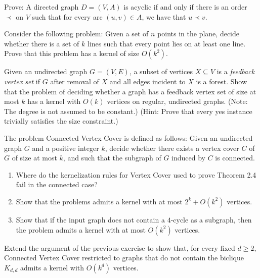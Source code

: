 \begin{exercise}[\easy]
  Prove: A directed graph $D = (V, A)$ is acyclic if and only if there is an order $\prec$ on $V$ such that for every arc $(u, v) \in A$, we have that $u \prec v$.
\end{exercise}

\begin{exercise}[\easy]
  Consider the following problem: Given a set of $n$ points in the plane, decide whether
  there is a set of $k$ lines such that every point lies on at least one line. Prove that this problem has a
  kernel of size $O(k^2)$.
\end{exercise}

\begin{exercise}
  Given an undirected graph $G = (V, E)$, a subset of vertices $X \subseteq V$ is a \emph{feedback vertex
  set} if $G$ after removal of $X$ and all edges incident to $X$ is a forest. Show that the problem of deciding
  whether a graph has a feedback vertex set of size at most $k$ has a kernel with $O(k)$ vertices on regular,
  undirected graphs. (Note: The degree is not assumed to be constant.)
  (Hint: Prove that every yes instance trivially satisfies the size constraint.)
\end{exercise}

\begin{exercise}
  The problem Connected Vertex Cover is defined as follows: Given an undirected graph
  $G$ and a positive integer $k$, decide whether there exists a vertex cover $C$ of $G$ of size at most $k$, and
  such that the subgraph of $G$ induced by $C$ is connected.
  \begin{enumerate}
      \item Where do the kernelization rules for Vertex Cover used to prove Theorem 2.4 fail in the connected
      case?
      \item Show that the problems admits a kernel with at most $2^k + O(k^2)$ vertices.
      \item Show that if the input graph does not contain a $4$-cycle as a subgraph, then the problem admits a
      kernel with at most $O(k^2)$ vertices.
  \end{enumerate}
\end{exercise}

\begin{exercise}[\hard]
  Extend the argument of the previous exercise to show that, for every fixed $d \geq 2$,
  Connected Vertex Cover restricted to graphs that do not contain the biclique $K_{d,d}$ admits a kernel
  with $O(k^d)$ vertices.
\end{exercise}

